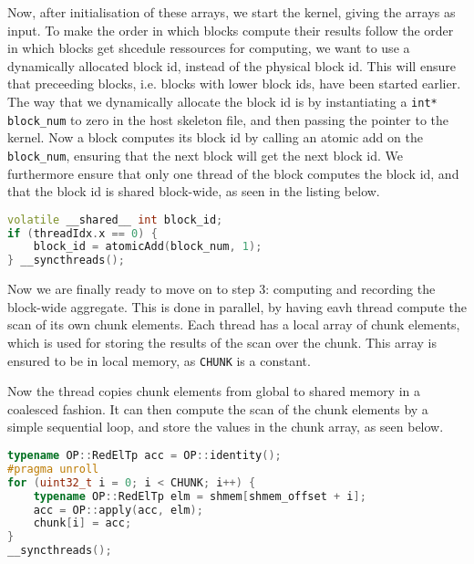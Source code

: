 Now, after initialisation of these arrays, we start the kernel, giving the arrays as input.
To make the order in which blocks compute their results follow the order in which blocks get shcedule ressources for computing, we want to use a dynamically allocated block id, instead of the physical block id.
This will ensure that preceeding blocks, i.e. blocks with lower block ids, have been started earlier.
The way that we dynamically allocate the block id is by instantiating a \texttt{int* block_num} to zero in the host skeleton file, and then passing the pointer to the kernel.
Now a block computes its block id by calling an atomic add on the \texttt{block_num}, ensuring that the next block will get the next block id.
We furthermore ensure that only one thread of the block computes the block id, and that the block id is shared block-wide, as seen in the listing below.
\begin{lstlisting}[language=c++]
volatile __shared__ int block_id;
if (threadIdx.x == 0) {
    block_id = atomicAdd(block_num, 1);
} __syncthreads();
\end{lstlisting}

Now we are finally ready to move on to step 3: computing and recording the block-wide aggregate.
This is done in parallel, by having eavh thread compute the scan of its own chunk elements.
Each thread has a local array of chunk elements, which is used for storing the results of the scan over the chunk.
This array is ensured to be in local memory, as \texttt{CHUNK} is a constant.

Now the thread copies chunk elements from global to shared memory in a coalesced fashion.
It can then compute the scan of the chunk elements by a simple sequential loop, and store the values in the chunk array, as seen below.
\begin{lstlisting}[language=c++]
typename OP::RedElTp acc = OP::identity();
#pragma unroll
for (uint32_t i = 0; i < CHUNK; i++) {
    typename OP::RedElTp elm = shmem[shmem_offset + i];
    acc = OP::apply(acc, elm);
    chunk[i] = acc;
}
__syncthreads();
\end{lstlisting}

